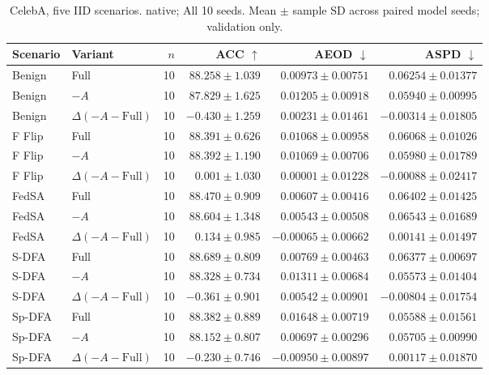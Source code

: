 \begin{table}[t]
\centering
\small
\caption{CelebA, five IID scenarios. native; All 10 seeds. Mean $\pm$ sample SD across paired model seeds; validation only.}
\begin{tabular}{llrrrr}
\toprule
Scenario & Variant & $n$ & ACC $\uparrow$ & AEOD $\downarrow$ & ASPD $\downarrow$ \\
\midrule
Benign & Full & 10 & $88.258 \pm 1.039$ & $0.00973 \pm 0.00751$ & $0.06254 \pm 0.01377$ \\
Benign & $-A$ & 10 & $87.829 \pm 1.625$ & $0.01205 \pm 0.00918$ & $0.05940 \pm 0.00995$ \\
Benign & $\Delta(-A-\mathrm{Full})$ & 10 & $-0.430 \pm 1.259$ & $0.00231 \pm 0.01461$ & $-0.00314 \pm 0.01805$ \\
F Flip & Full & 10 & $88.391 \pm 0.626$ & $0.01068 \pm 0.00958$ & $0.06068 \pm 0.01026$ \\
F Flip & $-A$ & 10 & $88.392 \pm 1.190$ & $0.01069 \pm 0.00706$ & $0.05980 \pm 0.01789$ \\
F Flip & $\Delta(-A-\mathrm{Full})$ & 10 & $0.001 \pm 1.030$ & $0.00001 \pm 0.01228$ & $-0.00088 \pm 0.02417$ \\
FedSA & Full & 10 & $88.470 \pm 0.909$ & $0.00607 \pm 0.00416$ & $0.06402 \pm 0.01425$ \\
FedSA & $-A$ & 10 & $88.604 \pm 1.348$ & $0.00543 \pm 0.00508$ & $0.06543 \pm 0.01689$ \\
FedSA & $\Delta(-A-\mathrm{Full})$ & 10 & $0.134 \pm 0.985$ & $-0.00065 \pm 0.00662$ & $0.00141 \pm 0.01497$ \\
S-DFA & Full & 10 & $88.689 \pm 0.809$ & $0.00769 \pm 0.00463$ & $0.06377 \pm 0.00697$ \\
S-DFA & $-A$ & 10 & $88.328 \pm 0.734$ & $0.01311 \pm 0.00684$ & $0.05573 \pm 0.01404$ \\
S-DFA & $\Delta(-A-\mathrm{Full})$ & 10 & $-0.361 \pm 0.901$ & $0.00542 \pm 0.00901$ & $-0.00804 \pm 0.01754$ \\
Sp-DFA & Full & 10 & $88.382 \pm 0.889$ & $0.01648 \pm 0.00719$ & $0.05588 \pm 0.01561$ \\
Sp-DFA & $-A$ & 10 & $88.152 \pm 0.807$ & $0.00697 \pm 0.00296$ & $0.05705 \pm 0.00990$ \\
Sp-DFA & $\Delta(-A-\mathrm{Full})$ & 10 & $-0.230 \pm 0.746$ & $-0.00950 \pm 0.00897$ & $0.00117 \pm 0.01870$ \\
\bottomrule
\end{tabular}
\end{table}

